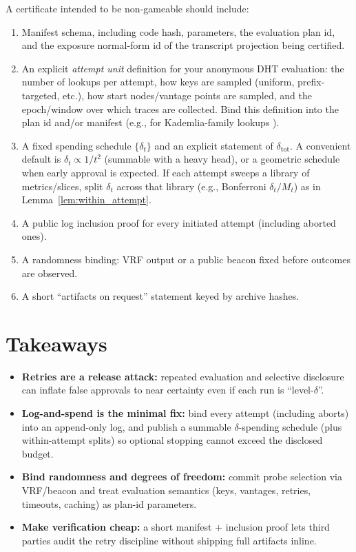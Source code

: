 \documentclass[11pt]{article}
\begin{document}
A certificate intended to be non-gameable should include:
\begin{enumerate}
\item Manifest schema, including code hash, parameters, the evaluation plan id, and the exposure normal-form id of the transcript projection being certified.
\item An explicit \emph{attempt unit} definition for your anonymous DHT evaluation: the number of lookups per attempt, how keys are sampled (uniform, prefix-targeted, etc.), how start nodes/vantage points are sampled, and the epoch/window over which traces are collected. Bind this definition into the plan id and/or manifest (e.g., for Kademlia-family lookups \cite{maymounkov2002kademlia}).
\item A fixed spending schedule $\{\delta_t\}$ and an explicit statement of $\delta_{\text{tot}}$. A convenient default is $\delta_t \propto 1/t^2$ (summable with a heavy head), or a geometric schedule when early approval is expected. If each attempt sweeps a library of metrics/slices, split $\delta_t$ across that library (e.g., Bonferroni $\delta_t/M_t$) as in Lemma~\ref{lem:within_attempt}.
\item A public log inclusion proof for every initiated attempt (including aborted ones).
\item A randomness binding: VRF output \cite{rfc9381,micali1999vrf} or a public beacon \cite{drand_spec,nist_beacon} fixed before outcomes are observed.
\item A short ``artifacts on request'' statement keyed by archive hashes.
\end{enumerate}

\section{Takeaways}
\begin{itemize}[leftmargin=*]
\item \textbf{Retries are a release attack:} repeated evaluation and selective disclosure can inflate false approvals to near certainty even if each run is ``level-$\delta$''.
\item \textbf{Log-and-spend is the minimal fix:} bind every attempt (including aborts) into an append-only log, and publish a summable $\delta$-spending schedule (plus within-attempt splits) so optional stopping cannot exceed the disclosed budget.
\item \textbf{Bind randomness and degrees of freedom:} commit probe selection via VRF/beacon and treat evaluation semantics (keys, vantages, retries, timeouts, caching) as plan-id parameters.
\item \textbf{Make verification cheap:} a short manifest + inclusion proof lets third parties audit the retry discipline without shipping full artifacts inline.
\end{itemize}
\end{document}
